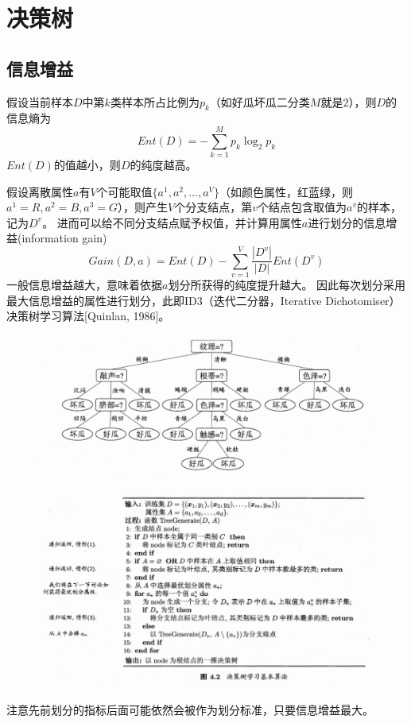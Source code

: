 
\section{决策树}
\subsection{信息增益}
假设当前样本$D$中第$k$类样本所占比例为$p_k$（如好瓜坏瓜二分类$M$就是$2$），则$D$的信息熵为
\[Ent(D)=-\sum_{k=1}^M p_k\log_2 p_k\]
$Ent(D)$的值越小，则$D$的纯度越高。

假设离散属性$a$有$V$个可能取值$\{a^1,a^2,\ldots,a^V\}$（如颜色属性，红蓝绿，则$a^1=R,a^2=B,a^3=G$），则产生$V$个分支结点，第$v$个结点包含取值为$a^v$的样本，记为$D^v$。
进而可以给不同分支结点赋予权值，并计算用属性$a$进行划分的信息增益(information gain)
\[Gain(D,a)=Ent(D)-\sum_{v=1}^V\frac{|D^v|}{|D|}Ent(D^v)\]
一般信息增益越大，意味着依据$a$划分所获得的纯度提升越大。
因此每次划分采用最大信息增益的属性进行划分，此即ID3（迭代二分器，Iterative Dichotomiser）决策树学习算法[Quinlan, 1986]。
\begin{figure}[H]
\centering
\includegraphics[width=0.6\linewidth]{fig/ID3.png}
\end{figure}

\begin{figure}[H]
\centering
\includegraphics[width=0.8\linewidth]{fig/decision_tree.jpg}
\end{figure}

注意先前划分的指标后面可能依然会被作为划分标准，只要信息增益最大。

